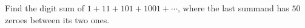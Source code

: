 Find the digit sum of $1+11+101+1001+\cdots$, where the last summand has $50$ zeroes between its two ones.
